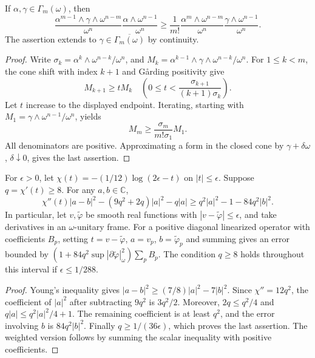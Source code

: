 \begin{lemma}\label{draft:595-hessian-mixed-trace}
If $\alpha,\gamma\in\Gamma_m(\omega)$, then
\[
 \frac{\alpha^{m-1}\wedge\gamma\wedge\omega^{n-m}}{\omega^n}
 \frac{\alpha\wedge\omega^{n-1}}{\omega^n}
 \geq\frac1{m!}
 \frac{\alpha^m\wedge\omega^{n-m}}{\omega^n}
 \frac{\gamma\wedge\omega^{n-1}}{\omega^n}.
\]
The assertion extends to $\gamma\in\overline{\Gamma_m(\omega)}$ by continuity.
\end{lemma}
\begin{proof}
Write $\sigma_k=\alpha^k\wedge\omega^{n-k}/\omega^n$, and
$M_k=\alpha^{k-1}\wedge\gamma\wedge\omega^{n-k}/\omega^n$.
For $1\leq k<m$, the cone shift with index $k+1$ and G\aa rding positivity give
\[
 M_{k+1}\geq tM_k
 \quad\left(0\leq t<\frac{\sigma_{k+1}}{(k+1)\sigma_k}\right).
\]
Let $t$ increase to the displayed endpoint. Iterating, starting with $M_1=\gamma\wedge\omega^{n-1}/\omega^n$, yields
\[
 M_m\geq\frac{\sigma_m}{m!\sigma_1}M_1.
\]
All denominators are positive. Approximating a form in the closed cone by $\gamma+\delta\omega$, $\delta\downarrow0$, gives the last assertion.
\end{proof}

\begin{lemma}\label{draft:595-hessian-gradient-absorption}
For $\epsilon>0$, let $\chi(t)=-(1/12)\log(2\epsilon-t)$ on $|t|\leq\epsilon$. Suppose $q=\chi'(t)\geq8$. For any $a,b\in\mathbb C$,
\[
 \chi''(t)|a-b|^2-(9q^2+2q)|a|^2-q|a|
       \geq q^2|a|^2-1-84q^2|b|^2.
\]
In particular, let $v,\widetilde\varphi$ be smooth real functions with $|v-\widetilde\varphi|\leq\epsilon$, and take derivatives in an $\omega$-unitary frame. For a positive diagonal linearized operator with coefficients $B_p$, setting $t=v-\widetilde\varphi$, $a=v_p$, $b=\widetilde\varphi_p$ and summing gives an error bounded by
$(1+84q^2\sup|\partial\widetilde\varphi|_\omega^2)\sum_pB_p$.
The condition $q\geq8$ holds throughout this interval if $\epsilon\leq1/288$.
\end{lemma}
\begin{proof}
Young's inequality gives $|a-b|^2\geq(7/8)|a|^2-7|b|^2$. Since $\chi''=12q^2$, the coefficient of $|a|^2$ after subtracting $9q^2$ is $3q^2/2$. Moreover, $2q\leq q^2/4$ and $q|a|\leq q^2|a|^2/4+1$. The remaining coefficient is at least $q^2$, and the error involving $b$ is $84q^2|b|^2$. Finally $q\geq1/(36\epsilon)$, which proves the last assertion. The weighted version follows by summing the scalar inequality with positive coefficients.
\end{proof}

